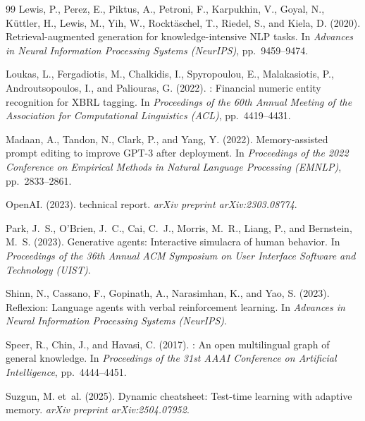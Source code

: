 \documentclass[12pt,a4paper,oneside]{article}
\begin{document}
\begin{thebibliography}{99}
Lewis, P., Perez, E., Piktus, A., Petroni, F., Karpukhin, V., Goyal, N., K\"uttler, H., Lewis, M., Yih, W., Rockt\"aschel, T., Riedel, S., and Kiela, D. (2020).
\newblock Retrieval-augmented generation for knowledge-intensive {NLP} tasks.
\newblock In \textit{Advances in Neural Information Processing Systems (NeurIPS)}, pp.~9459--9474.

Loukas, L., Fergadiotis, M., Chalkidis, I., Spyropoulou, E., Malakasiotis, P., Androutsopoulos, I., and Paliouras, G. (2022).
: Financial numeric entity recognition for {XBRL} tagging.
\newblock In \textit{Proceedings of the 60th Annual Meeting of the Association for Computational Linguistics (ACL)}, pp.~4419--4431.

Madaan, A., Tandon, N., Clark, P., and Yang, Y. (2022).
\newblock Memory-assisted prompt editing to improve {GPT-3} after deployment.
\newblock In \textit{Proceedings of the 2022 Conference on Empirical Methods in Natural Language Processing (EMNLP)}, pp.~2833--2861.

OpenAI. (2023).
 technical report.
\newblock \textit{arXiv preprint arXiv:2303.08774}.

Park, J.~S., O'Brien, J.~C., Cai, C.~J., Morris, M.~R., Liang, P., and Bernstein, M.~S. (2023).
\newblock Generative agents: Interactive simulacra of human behavior.
\newblock In \textit{Proceedings of the 36th Annual ACM Symposium on User Interface Software and Technology (UIST)}.

Shinn, N., Cassano, F., Gopinath, A., Narasimhan, K., and Yao, S. (2023).
\newblock Reflexion: Language agents with verbal reinforcement learning.
\newblock In \textit{Advances in Neural Information Processing Systems (NeurIPS)}.

Speer, R., Chin, J., and Havasi, C. (2017).
: An open multilingual graph of general knowledge.
\newblock In \textit{Proceedings of the 31st AAAI Conference on Artificial Intelligence}, pp.~4444--4451.

Suzgun, M. et~al. (2025).
\newblock Dynamic cheatsheet: Test-time learning with adaptive memory.
\newblock \textit{arXiv preprint arXiv:2504.07952}.


\end{thebibliography}
\end{document}
